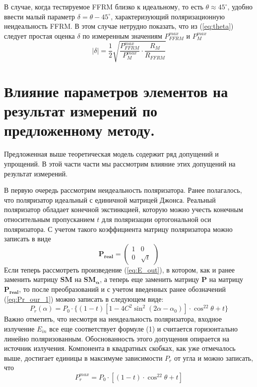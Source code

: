 \documentclass{article}
\begin{document}
В случае, когда тестируемое FFRM близко к идеальному, то есть $\theta \approx 45^\circ$, удобно ввести малый параметр $\delta = \theta - 45^\circ$, характеризующий поляризационную неидеальность FFRM.
В этом случае нетрудно показать, что из (\ref{eq:theta}) следует простая оценка $\delta$ по измеренным значениям $P_{FFRM}^{max}$ и $P_M^{max}$
\begin{equation}
    \label{eq:delta}
    |\delta| =\frac{1}{2}\sqrt{\frac{P_{FFRM}^{max}}{P_M^{max}}\cdot\frac{R_M}{R_{FFRM}}}
\end{equation}


\section{Влияние параметров элементов на результат измерений по предложенному методу.}
Предложенная выше теоретическая модель содержит ряд допущений и упрощений.
В этой части части мы рассмотрим влияние этих допущений на результат измерений.

В первую очередь рассмотрим неидеальность поляризатора. Ранее полагалось, что поляризатор идеальный с единичной матрицей Джонса.
Реальный поляризатор обладает конечной экстинкцией, которую можно учесть конечным относительным пропусканием $t$ для поляризации ортогональной оси поляризатора.
С учетом такого коэффициента матрицу поляризатора можно записать в виде      
\begin{equation}
	\bm{P_{real}} = 
	\begin{pmatrix}
		1 & 0 \\
		0 & \sqrt{t}
	\end{pmatrix}	
\end{equation}
Если теперь рассмотреть произведение (\ref{eq:E_out}), в котором, как и ранее заменить матрицу $\bm{SM}$ на $\bm{SM_\alpha}$, а теперь еще заменить матрицу $\bm{P}$ на матрицу $\bm{P_{real}}$, то после преобразований и с учетом введенных ранее обозначений (\ref{eq:Pr_our_1}) можно записать в следующем виде: 
\begin{equation}
    P_r(\alpha)=P_0\cdot\{(1-t)\left[1-4C^2\sin^2(2\alpha-\alpha_0)\right]\cdot \cos^22\theta+t \}
\end{equation}
Важно отметить, что несмотря на неидеальность поляризатора, входное излучение $E_{in}$ все еще соответствует формуле (1) и считается горизонтально линейно поляризованным. Обоснованность этого допущения опирается на источник излучения.
Компонента в квадратных скобках, как уже отмечалось выше, достигает единицы в максимуме зависимости $P_r$ от угла и можно записать, что 
\begin{equation}
    \label{eq:Pr_max}
    P_r^{max}=P_0\cdot\left[(1-t)\cdot \cos^22\theta+t \right]
\end{equation}
\end{document}
